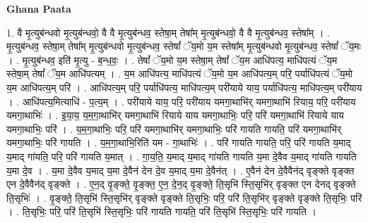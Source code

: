 \documentclass[17pt]{extarticle}
\begin{document}
\textbf{Ghana Paata } \newline

1. वै मृ॒त्युब॑न्धवो मृ॒त्युब॑न्धवो॒ वै वै मृ॒त्युब॑न्धव॒ स्तेषा॒म् तेषा᳚म् मृ॒त्युब॑न्धवो॒ वै वै मृ॒त्युब॑न्धव॒ स्तेषा᳚म् । . मृ॒त्युब॑न्धव॒ स्तेषा॒म् तेषा᳚म् मृ॒त्युब॑न्धवो मृ॒त्युब॑न्धव॒ स्तेषां᳚ ॅय॒मो य॒म स्तेषा᳚म् मृ॒त्युब॑न्धवो मृ॒त्युब॑न्धव॒ स्तेषां᳚ ॅय॒मः । . मृ॒त्युब॑न्धव॒ इति॑ मृ॒त्यु - ब॒न्ध॒वः॒ । . तेषां᳚ ॅय॒मो य॒म स्तेषा॒म् तेषां᳚ ॅय॒म आधि॑पत्य॒ माधि॑पत्यं ॅय॒म स्तेषा॒म् तेषां᳚ ॅय॒म आधि॑पत्यम् । . य॒म आधि॑पत्य॒ माधि॑पत्यं ॅय॒मो य॒म आधि॑पत्य॒म् परि॒ पर्याधि॑पत्यं ॅय॒मो य॒म आधि॑पत्य॒म् परि॑ । . आधि॑पत्य॒म् परि॒ पर्याधि॑पत्य॒ माधि॑पत्य॒म् परी॑याये याय॒ पर्याधि॑पत्य॒ माधि॑पत्य॒म् परी॑याय । . आधि॑पत्य॒मित्याधि॑ - प॒त्य॒म् । . परी॑याये याय॒ परि॒ परी॑याय यमगा॒थाभि॑र् यमगा॒थाभि॑ रियाय॒ परि॒ परी॑याय यमगा॒थाभिः॑ । . इ॒या॒य॒ य॒म॒गा॒थाभि॑र् यमगा॒थाभि॑ रियाये याय यमगा॒थाभिः॒ परि॒ परि॑ यमगा॒थाभि॑ रियाये याय यमगा॒थाभिः॒ परि॑ । . य॒म॒गा॒थाभिः॒ परि॒ परि॑ यमगा॒थाभि॑र् यमगा॒थाभिः॒ परि॑ गायति गायति॒ परि॑ यमगा॒थाभि॑र् यमगा॒थाभिः॒ परि॑ गायति । . य॒म॒गा॒थाभि॒रिति॑ यम - गा॒थाभिः॑ । . परि॑ गायति गायति॒ परि॒ परि॑ गायति य॒माद् य॒माद् गा॑यति॒ परि॒ परि॑ गायति य॒मात् । . गा॒य॒ति॒ य॒माद् य॒माद् गा॑यति गायति य॒मा दे॒वैव य॒माद् गा॑यति गायति य॒मा दे॒व । . य॒मा दे॒वैव य॒माद् य॒मा दे॒वैन॑ देन दे॒व य॒माद् य॒मा दे॒वैन॑त् । . ए॒वैन॑ देन दे॒वैवैन॑द् वृङ्क्ते वृङ्क्त एन दे॒वैवैन॑द् वृङ्क्ते । . ए॒न॒द् वृ॒ङ्क्ते॒ वृ॒ङ्क्त॒ ए॒न॒ दे॒न॒द् वृ॒ङ्क्ते॒ ति॒सृभि॑ स्ति॒सृभि॑र् वृङ्क्त एन देनद् वृङ्क्ते ति॒सृभिः॑ । . वृ॒ङ्क्ते॒ ति॒सृभि॑ स्ति॒सृभि॑र् वृङ्क्ते वृङ्क्ते ति॒सृभिः॒ परि॒ परि॑ ति॒सृभि॑र् वृङ्क्ते वृङ्क्ते ति॒सृभिः॒ परि॑ । . ति॒सृभिः॒ परि॒ परि॑ ति॒सृभि॑ स्ति॒सृभिः॒ परि॑ गायति गायति॒ परि॑ ति॒सृभि॑ स्ति॒सृभिः॒ परि॑ गायति । \newline
\end{document}
